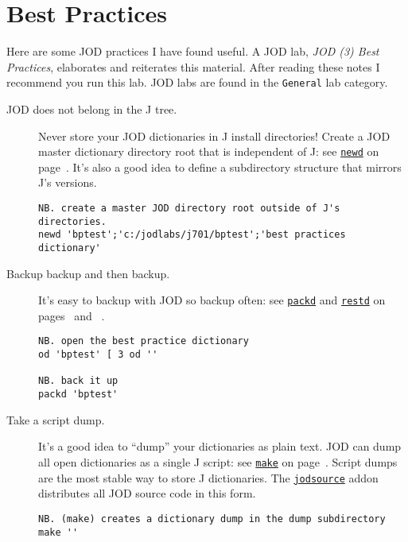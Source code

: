 \section{Best Practices}

Here are some JOD practices I have found useful.  A JOD lab, \emph{JOD (3) Best Practices}, elaborates and reiterates this material.  After reading these notes I recommend you run this lab.  JOD labs are 
found in the \texttt{General} lab category.


\begin{description}
\item[JOD does not belong in the J tree.] Never store your JOD dictionaries in J install directories!  Create a JOD master dictionary directory root that is  independent of J: see \hyperlink{il:newd}{\texttt{newd}} on page~\pageref{ss:newd}.  It's also a good idea to define a subdirectory structure that mirrors J's versions. 

\begin{lstlisting}[frame=single,framerule=0pt]
NB. create a master JOD directory root outside of J's directories.
newd 'bptest';'c:/jodlabs/j701/bptest';'best practices dictionary'
\end{lstlisting}

\item[Backup backup and then backup.]  It's easy to backup with JOD so backup often: see 
\hyperlink{il:packd}{\texttt{packd}} and \hyperlink{il:restd}{\texttt{restd}} on pages~\pageref{ss:packd} and ~\pageref{ss:restd}.

\begin{lstlisting}[frame=single,framerule=0pt]
NB. open the best practice dictionary
od 'bptest' [ 3 od ''

NB. back it up
packd 'bptest'
\end{lstlisting}
 

\item[Take a script dump.]  It's a good idea to ``dump'' your dictionaries as plain text.  JOD can dump all open dictionaries as a single J script: see \hyperlink{il:make}{\texttt{make}} on page~\pageref{ss:make}. Script dumps are the most stable way to store J dictionaries.  The 
\href{http://www.jsoftware.com/jwiki/Addons/general/jodsource}{\texttt{jodsource}} addon 
distributes all JOD source code in this form.

\begin{lstlisting}[frame=single,framerule=0pt]
NB. (make) creates a dictionary dump in the dump subdirectory
make ''
\end{lstlisting}
 

\end{description}
